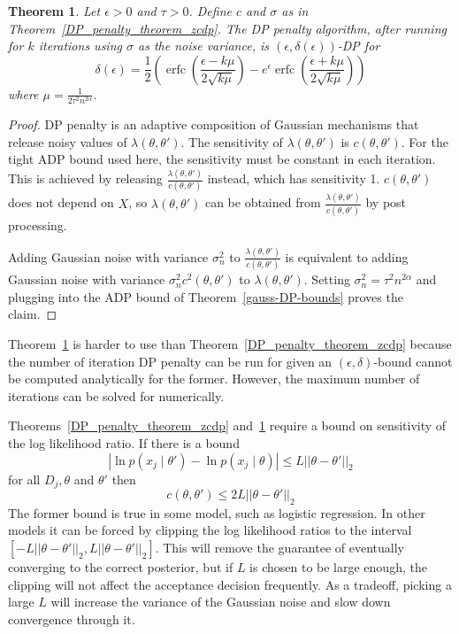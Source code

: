 \documentclass[english,twoside,openright]{HYgraduMLDS}
\newtheorem{theorem}{Theorem}
\DeclareMathOperator{\erfc}{erfc}
\begin{document}
\begin{theorem}\label{DP_penalty_theorem_adp}
    Let \(\epsilon > 0\) and \(\tau > 0\).
    Define \(c\) and \(\sigma\) as in Theorem~\ref{DP_penalty_theorem_zcdp}.
    The DP penalty algorithm, after running for \(k\) iterations using \(\sigma\)
    as the noise variance, 
    is \((\epsilon, \delta(\epsilon))\)-DP for
    \[
        \delta(\epsilon) 
        = \frac{1}{2}\left(
            \erfc\left(\frac{\epsilon - k\mu}{2\sqrt{k\mu}}\right)
            - e^\epsilon \erfc\left(\frac{\epsilon + k\mu}{2\sqrt{k\mu}}\right)
        \right)
    \]
    where \(\mu = \frac{1}{2\tau^2 n^{2\alpha}}\).
\end{theorem}
\begin{proof}
    DP penalty is an adaptive composition of Gaussian mechanisms that release 
    noisy values of \(\lambda(\theta, \theta')\). The sensitivity of 
    \(\lambda(\theta, \theta')\) is 
    \(c(\theta, \theta')\). For the tight ADP bound used here, the sensitivity must be 
    constant in each iteration. This is achieved by releasing 
    \(\frac{\lambda(\theta, \theta')}{c(\theta, \theta')}\) instead, which 
    has sensitivity 1. \(c(\theta, \theta')\) does not depend on \(X\), 
    so \(\lambda(\theta, \theta')\) can be obtained from 
    \(\frac{\lambda(\theta, \theta')}{c(\theta, \theta')}\) by post processing.

    Adding Gaussian noise with variance \(\sigma_n^2\) to 
    \(\frac{\lambda(\theta, \theta')}{c(\theta, \theta')}\)
    is equivalent to adding Gaussian noise with variance 
    \(\sigma_n^2 c^2(\theta, \theta')\) to \(\lambda(\theta, \theta')\).
    Setting \(\sigma_n^2 = \tau^2n^{2\alpha}\) and plugging into 
    the ADP bound of Theorem~\ref{gauss-DP-bounds} proves the 
    claim.
\end{proof}

Theorem~\ref{DP_penalty_theorem_adp} is harder to use than 
Theorem~\ref{DP_penalty_theorem_zcdp} because the number of iteration 
DP penalty can be run for given an \((\epsilon, \delta)\)-bound cannot be 
computed analytically for the former. However, the maximum number of iterations 
can be solved for numerically.

Theorems~\ref{DP_penalty_theorem_zcdp} and~\ref{DP_penalty_theorem_adp}
require a bound on sensitivity of the log likelihood ratio. If there is a bound 
\[
    |\ln p(x_j\mid \theta') - \ln p(x_j\mid \theta)| \leq L||\theta - \theta'||_2
\]
for all \(D_j, \theta\) and \(\theta'\) then 
\[
    c(\theta, \theta') \leq 2L||\theta - \theta'||_2
\]
The former bound is true in some model, such as logistic regression. In other 
models it can be forced by clipping the log likelihood ratios to the interval 
\([-L||\theta - \theta'||_2, L||\theta - \theta'||_2]\). This will remove the 
guarantee of eventually converging to the correct posterior, but if \(L\) is 
chosen to be large enough, the clipping will not affect the 
acceptance decision frequently. As a tradeoff, picking a large \(L\) will increase 
the variance of the Gaussian noise and slow down convergence through it.
\end{document}
